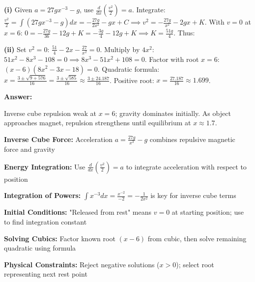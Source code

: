 \begin{solution}
\textbf{(i)} Given $a = 27gx^{-3} - g$, use $\frac{d}{dx}\left(\frac{v^2}{2}\right) = a$. Integrate: $\frac{v^2}{2} = \int(27gx^{-3} - g)dx = -\frac{27g}{2x^2} - gx + C \implies v^2 = -\frac{27g}{x^2} - 2gx + K$. With $v=0$ at $x=6$: $0 = -\frac{27g}{36} - 12g + K = -\frac{3g}{4} - 12g + K \implies K = \frac{51g}{4}$. Thus:

 \quad {}

\textbf{(ii)} Set $v^2=0$: $\frac{51}{4} - 2x - \frac{27}{x^2} = 0$. Multiply by $4x^2$: $51x^2 - 8x^3 - 108 = 0 \implies 8x^3 - 51x^2 + 108 = 0$. Factor with root $x=6$: $(x-6)(8x^2-3x-18)=0$. Quadratic formula: $x = \frac{3 \pm \sqrt{9+576}}{16} = \frac{3 \pm \sqrt{585}}{16} \approx \frac{3 \pm 24.187}{16}$. Positive root: $x = \frac{27.187}{16} \approx 1.699$.

\textbf{Answer:} 

Inverse cube repulsion weak at $x=6$; gravity dominates initially. As object approaches magnet, repulsion strengthens until equilibrium at $x \approx 1.7$.
\end{solution}

\begin{takeaways}
\item \textbf{Inverse Cube Force:} Acceleration $a = \frac{27g}{x^3} - g$ combines repulsive magnetic force and gravity
\item \textbf{Energy Integration:} Use $\frac{d}{dx}\left(\frac{v^2}{2}\right) = a$ to integrate acceleration with respect to position
\item \textbf{Integration of Powers:} $\int x^{-3}dx = \frac{x^{-2}}{-2} = -\frac{1}{2x^2}$ is key for inverse cube terms
\item \textbf{Initial Conditions:} "Released from rest" means $v=0$ at starting position; use to find integration constant
\item \textbf{Solving Cubics:} Factor known root $(x-6)$ from cubic, then solve remaining quadratic using formula
\item \textbf{Physical Constraints:} Reject negative solutions ($x > 0$); select root representing next rest point
\end{takeaways}

\newpage

